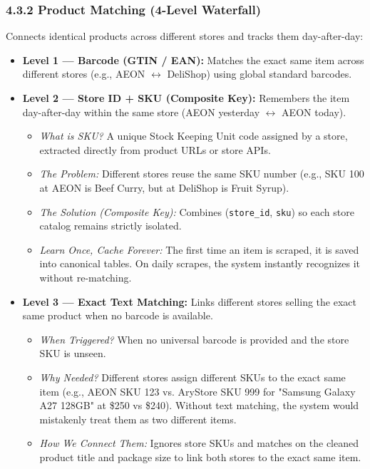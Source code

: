 \documentclass[10pt,a4paper]{article}
\begin{document}
\subsubsection*{4.3.2 Product Matching (4-Level Waterfall)}
\noindent
Connects identical products across different stores and tracks them day-after-day:
\begin{itemize}[noitemsep,topsep=1pt,leftmargin=*]
    \item \textbf{Level 1 --- Barcode (GTIN / EAN):} Matches the exact same item across different stores (e.g., AEON $\leftrightarrow$ DeliShop) using global standard barcodes.
    \item \textbf{Level 2 --- Store ID + SKU (Composite Key):} Remembers the item day-after-day within the same store (AEON yesterday $\leftrightarrow$ AEON today).
    \begin{itemize}[noitemsep]
        \item \textit{What is SKU?} A unique Stock Keeping Unit code assigned by a store, extracted directly from product URLs or store APIs.
        \item \textit{The Problem:} Different stores reuse the same SKU number (e.g., SKU 100 at AEON is Beef Curry, but at DeliShop is Fruit Syrup).
        \item \textit{The Solution (Composite Key):} Combines (\texttt{store\_id}, \texttt{sku}) so each store catalog remains strictly isolated.
        \item \textit{Learn Once, Cache Forever:} The first time an item is scraped, it is saved into canonical tables. On daily scrapes, the system instantly recognizes it without re-matching.
    \end{itemize}
    \item \textbf{Level 3 --- Exact Text Matching:} Links different stores selling the exact same product when no barcode is available.
    \begin{itemize}[noitemsep]
        \item \textit{When Triggered?} When no universal barcode is provided and the store SKU is unseen.
        \item \textit{Why Needed?} Different stores assign different SKUs to the exact same item (e.g., AEON SKU 123 vs. AryStore SKU 999 for "Samsung Galaxy A27 128GB" at \$250 vs \$240). Without text matching, the system would mistakenly treat them as two different items.
        \item \textit{How We Connect Them:} Ignores store SKUs and matches on the cleaned product title and package size to link both stores to the exact same item.

\end{itemize}
\end{itemize}
\end{document}
